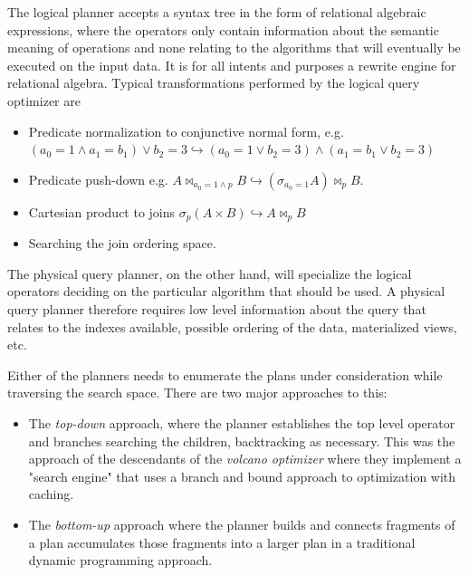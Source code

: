 The logical planner accepts a syntax tree in the form of relational
algebraic expressions, where the operators only contain information
about the semantic meaning of operations and none relating to the
algorithms that will eventually be executed on the input data. It is
for all intents and purposes a rewrite engine for relational
algebra. Typical transformations performed by the logical query
optimizer are

\begin{itemize}
\item Predicate normalization to conjunctive normal form, e.g. \((a_0 = 1
  \land a_1 = b_1) \lor b_2 = 3 \hookrightarrow (a_0 = 1 \lor b_2 = 3)
  \land (a_1 = b_1 \lor b_2 = 3)\)
\item Predicate push-down e.g. \(A \Join_{a_0 = 1 \land p} B
  \hookrightarrow (\sigma_{a_0 = 1} A) \Join_p B\).
\item Cartesian product to joins \(\sigma_p ( A \times B )
  \hookrightarrow A \Join_p B\)
\item Searching the join ordering space.
\end{itemize}

The physical query planner, on the other hand, will specialize the
logical operators deciding on the particular algorithm that should be
used. A physical query planner therefore requires low level
information about the query that relates to the indexes available,
possible ordering of the data, materialized views, etc.

Either of the planners needs to enumerate the plans under
consideration while traversing the search space. There are two major
approaches to this:

\begin{itemize}
\item The \emph{top-down} approach, where the planner establishes the
  top level operator and branches searching the children, backtracking
  as necessary. This was the approach of the descendants of the
  \emph{volcano optimizer} \cite{graefeVolcanoOptimizerGenerator1993a}
  where they implement a "search engine" that uses a branch and bound
  approach to optimization with caching.
\item The \emph{bottom-up} approach where the planner builds and connects
  fragments of a plan accumulates those fragments into a larger plan in a
  traditional dynamic programming approach.
  \cite{raasveldtDuckdbEmbeddableAnalytical2019,kemperHyPerHybridOLTP2011}
\end{itemize}

